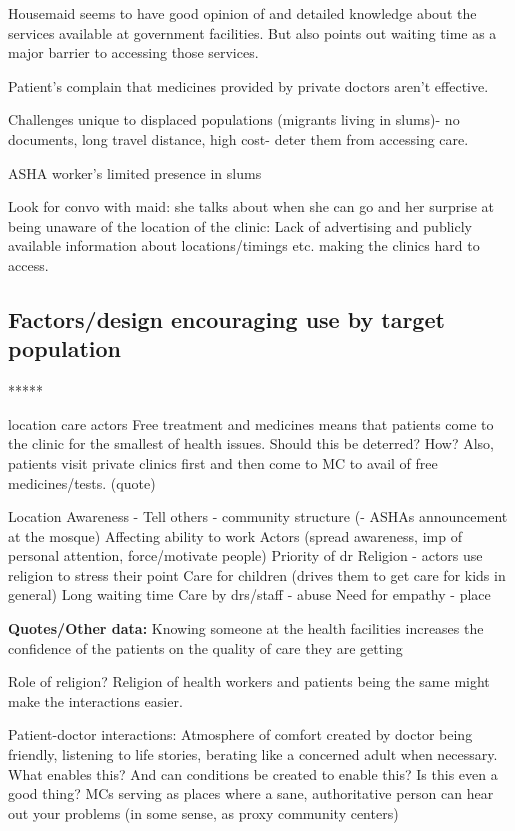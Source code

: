 Housemaid seems to have good opinion of and detailed knowledge about the services available at government facilities. But also points out waiting time as a major barrier to accessing those services.

Patient's complain that medicines provided by private doctors aren't effective. 

Challenges unique to displaced populations (migrants living in slums)- no documents, long travel distance, high cost- deter them from accessing care.

ASHA worker's limited presence in slums 

Look for convo with maid: she talks about when she can go and her surprise at being unaware of the location of the clinic: Lack of advertising and publicly available information about locations/timings etc.  making the clinics hard to access.

\subsection{Factors/design encouraging use by target population}

*****

location
care
actors
Free treatment and medicines means that patients come to the clinic for the smallest of health issues. Should this be deterred? How? Also, patients visit private clinics first and then come to MC to avail of free medicines/tests. (quote)

Location
Awareness - Tell others - community structure (- ASHAs announcement at the mosque)
Affecting ability to work
Actors (spread awareness, imp of personal attention, force/motivate people)
Priority of dr
Religion - actors use religion to stress their point
Care for children (drives them to get care for kids in general)
Long waiting time
Care by drs/staff - abuse 
Need for empathy - place

\textbf{Quotes/Other data:}
Knowing someone at the health facilities increases the confidence of the patients on the quality of care they are getting

Role of religion? Religion of health workers and patients being the same might make the interactions easier.

Patient-doctor interactions: Atmosphere of comfort created by doctor being friendly, listening to life stories, berating like a concerned adult when necessary. What enables this? And can conditions be created to enable this? Is this even a good thing? MCs serving as places where a sane, authoritative person can hear out your problems (in some sense, as proxy community centers)

